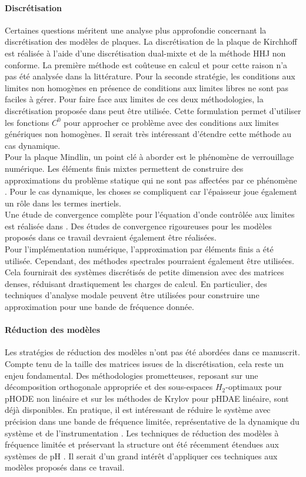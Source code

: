 \paragraph{Discrétisation}
Certaines questions méritent une analyse plus approfondie concernant la discrétisation des modèles de plaques. La discrétisation de la plaque de Kirchhoff est réalisée à l'aide d'une discrétisation dual-mixte et de la méthode HHJ non conforme. La première méthode est coûteuse en calcul et pour cette raison n'a pas été analysée dans la littérature. Pour la seconde stratégie, les conditions aux limites non homogènes en présence de conditions aux limites libres ne sont pas faciles à gérer. Pour faire face aux limites de ces deux méthodologies, la discrétisation proposée dans \cite{rafetseder2018siam} peut être utilisée. Cette formulation permet d'utiliser les fonctions $ C^0$ pour approcher ce problème avec des conditions aux limites génériques non homogènes. Il serait très intéressant d'étendre cette méthode au cas dynamique. \\ Pour la plaque Mindlin, un point clé à aborder est le phénomène de verrouillage numérique. Les éléments finis mixtes permettent de construire des approximations du problème statique qui ne sont pas affectées par ce phénomène \cite{veiga2013}. Pour le cas dynamique, les choses se compliquent car l'épaisseur joue également un rôle dans les termes inertiels. \\ Une étude de convergence complète pour l'équation d'onde contrôlée aux limites est réalisée dans \cite{haine2020numerical}. Des études de convergence rigoureuses pour les modèles proposés dans ce travail devraient également être réalisées. \\ Pour l'implémentation numérique, l'approximation par éléments finis a été utilisée. Cependant, des méthodes spectrales pourraient également être utilisées. Cela fournirait des systèmes discrétisés de petite dimension avec des matrices denses, réduisant drastiquement les charges de calcul. En particulier, des techniques d'analyse modale peuvent être utilisées pour construire une approximation pour une bande de fréquence donnée.

\paragraph{Réduction des modèles}
Les stratégies de réduction des modèles n'ont pas été abordées dans ce manuscrit. Compte tenu de la taille des matrices issues de la discrétisation, cela reste un enjeu fondamental. Des méthodologies prometteuses, reposant sur une décomposition orthogonale appropriée et des sous-espaces $H_2$-optimaux pour pHODE \cite{chaturantabut2016} non linéaire et sur les méthodes de Krylov pour pHDAE \cite{egger2018} linéaire, sont déjà disponibles. En pratique, il est intéressant de réduire le système avec précision dans une bande de fréquence limitée, représentative de la dynamique du système et de l'instrumentation \cite{vuillemin2014frequency}. Les techniques de réduction des modèles à fréquence limitée et préservant la structure ont été récemment étendues aux systèmes de pH \cite{xu2020sp}. Il serait d'un grand intérêt d'appliquer ces techniques aux modèles proposés dans ce travail.

